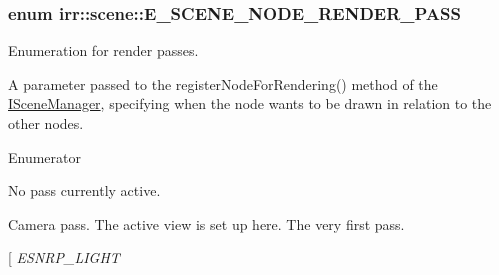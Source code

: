 \subsubsection[{\texorpdfstring{E\+\_\+\+S\+C\+E\+N\+E\+\_\+\+N\+O\+D\+E\+\_\+\+R\+E\+N\+D\+E\+R\+\_\+\+P\+A\+SS}{E\_SCENE\_NODE\_RENDER\_PASS}}]{\setlength{\rightskip}{0pt plus 5cm}enum {\bf irr\+::scene\+::\+E\+\_\+\+S\+C\+E\+N\+E\+\_\+\+N\+O\+D\+E\+\_\+\+R\+E\+N\+D\+E\+R\+\_\+\+P\+A\+SS}}\hypertarget{namespaceirr_1_1scene_a7862269bd1abc123929d4dbb8200d67f}{}\label{namespaceirr_1_1scene_a7862269bd1abc123929d4dbb8200d67f}


Enumeration for render passes. 

A parameter passed to the register\+Node\+For\+Rendering() method of the \hyperlink{classirr_1_1scene_1_1ISceneManager}{I\+Scene\+Manager}, specifying when the node wants to be drawn in relation to the other nodes. \begin{Desc}
\item[Enumerator]\par
\begin{description}
\item[{\em 
E\+S\+N\+R\+P\+\_\+\+N\+O\+NE\hypertarget{namespaceirr_1_1scene_a7862269bd1abc123929d4dbb8200d67fa1f79a46e7a41716dcae5c8dfe8d310bb}{}\label{namespaceirr_1_1scene_a7862269bd1abc123929d4dbb8200d67fa1f79a46e7a41716dcae5c8dfe8d310bb}
}]No pass currently active. \item[{\em 
E\+S\+N\+R\+P\+\_\+\+C\+A\+M\+E\+RA\hypertarget{namespaceirr_1_1scene_a7862269bd1abc123929d4dbb8200d67fa26f6af7911240e22003f327aef126053}{}\label{namespaceirr_1_1scene_a7862269bd1abc123929d4dbb8200d67fa26f6af7911240e22003f327aef126053}
}]Camera pass. The active view is set up here. The very first pass. \item[{\em 
E\+S\+N\+R\+P\+\_\+\+L\+I\+G\+HT\hypertarget{namespaceirr_1_1scene_a7862269bd1abc123929d4dbb8200d67fa1390daf021e4354eb3dc8d5d46fb7dc0}{}\label{namespaceirr_1_1scene_a7862269bd1abc123929d4dbb8200d67fa1390daf021e4354eb3dc8d5d46fb7dc0}
}
\end{description}
\end{Desc}
